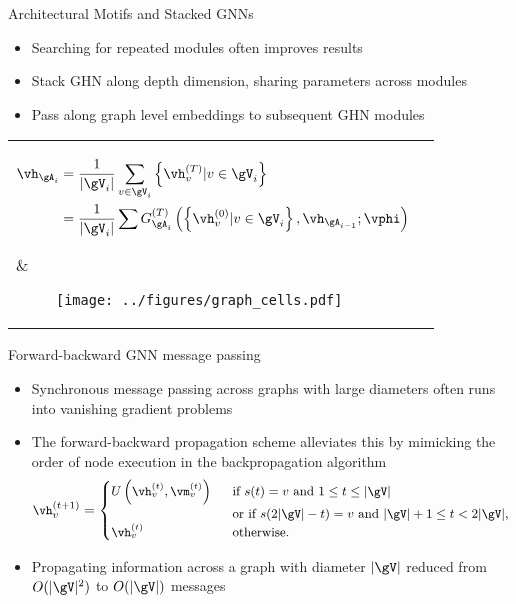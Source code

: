 \documentclass[final,t]{beamer}
\begin{document}
\begin{frame}{}
\begin{columns}[t]
\begin{column}{.32\linewidth}
  	\begin{exampleblock}{Architectural Motifs and Stacked GNNs}
  		\begin{itemize}
			\item Searching for repeated modules often improves results
			\item Stack GHN along depth dimension, sharing parameters across modules
			\item Pass along graph level embeddings to subsequent GHN modules
		\end{itemize}
		
  	\begin{tabular}{p{}p{}}
  	\hspace{1cm}
  	\vspace{0.8cm}
	\parbox{1cm}{\small\begin{align*}
		\vh_{\gA_i} &= \frac{1}{|\gV_i|}\sum_{v\in \gV_i} \left\{\vh_v^{(T)} | v \in \gV_i \right\} \\
		                 &= \frac{1}{|\gV_i|}\sum G_{\gA_i}^{(T)}\left(\left\{\vh_v^{(0)} | v \in \gV_i \right\}, \vh_{\gA_{i-1}}; \vphi\right) %
		\end{align*}} &  	
  		\vspace{-1.6in}
	  	\begin{figure}
			\texttt{[image: ../figures/graph\_cells.pdf]}
		\end{figure}   
	\end{tabular}
	\vspace{-1in}
	\end{exampleblock}
	
  	\begin{exampleblock}{Forward-backward GNN message passing}
 	\begin{itemize}
 		\item Synchronous message passing across graphs with large diameters often runs into vanishing gradient problems
 		\item The forward-backward propagation scheme alleviates this by mimicking the order of node execution in the backpropagation algorithm
 		\begin{equation*}
 		 		\small
			\vh_v^{(t+1)} = 
			\begin{cases}
			U \left(\vh_v^{(t)}, \vm_v^{(t)} \right) \ \ & \text{if } s(t) = v \text{ and } 1 \le t \le |\gV|\\
			  \ \ & \text{or if } s(2|\gV| - t) = v \text{ and } |\gV| + 1 \le t < 2|\gV|,\\
			\vh_v^{(t)} \ \ & \text{otherwise}.
			\end{cases}
		\end{equation*}
		\item Propagating information across a graph with diameter $|\gV|$ reduced from  $O(|\gV|^2)$ to $O(|\gV|)$ messages
 	\end{itemize}
 	

\end{exampleblock}
\end{column}
\end{columns}
\end{frame}
\end{document}
